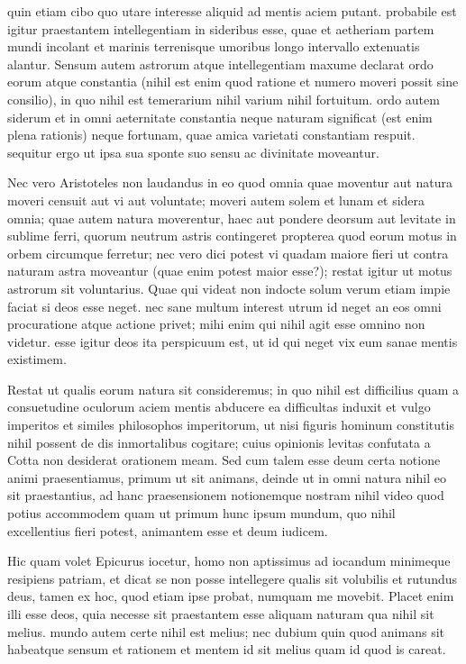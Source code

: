  quin etiam cibo quo utare interesse aliquid ad mentis aciem putant. probabile est igitur praestantem intellegentiam in sideribus esse, quae et aetheriam partem mundi incolant et marinis terrenisque umoribus longo intervallo extenuatis alantur. Sensum autem astrorum atque intellegentiam maxume declarat ordo eorum atque constantia (nihil est enim quod ratione et numero moveri possit sine consilio), in quo nihil est temerarium nihil varium nihil fortuitum. ordo autem siderum et in omni aeternitate constantia neque naturam significat (est enim plena rationis) neque fortunam, quae amica varietati constantiam respuit. sequitur ergo ut ipsa sua sponte suo sensu ac divinitate moveantur.

 Nec vero Aristoteles non laudandus in eo quod omnia quae moventur aut natura moveri censuit aut vi aut voluntate; moveri autem solem et lunam et sidera omnia; quae autem natura moverentur, haec aut pondere deorsum aut levitate in sublime ferri, quorum neutrum astris contingeret propterea quod eorum motus in orbem circumque ferretur; nec vero dici potest vi quadam maiore fieri ut contra naturam astra moveantur (quae enim potest maior esse?); restat igitur ut motus astrorum sit voluntarius. Quae qui videat non indocte solum verum etiam impie faciat si deos esse neget. nec sane multum interest utrum id neget an eos omni procuratione atque actione privet; mihi enim qui nihil agit esse omnino non videtur. esse igitur deos ita perspicuum est, ut id qui neget vix eum sanae mentis existimem.

 Restat ut qualis eorum natura sit consideremus; in quo nihil est difficilius quam a consuetudine oculorum aciem mentis abducere ea difficultas induxit et vulgo imperitos et similes philosophos imperitorum, ut nisi figuris hominum constitutis nihil possent de dis inmortalibus cogitare; cuius opinionis levitas confutata a Cotta non desiderat orationem meam. Sed cum talem esse deum certa notione animi praesentiamus, primum ut sit animans, deinde ut in omni natura nihil eo sit praestantius, ad hanc praesensionem notionemque nostram nihil video quod potius accommodem quam ut primum hunc ipsum mundum, quo nihil excellentius fieri potest, animantem esse et deum iudicem.

 Hic quam volet Epicurus iocetur, homo non aptissimus ad iocandum minimeque resipiens patriam, et dicat se non posse intellegere qualis sit volubilis et rutundus deus, tamen ex hoc, quod etiam ipse probat, numquam me movebit. Placet enim illi esse deos, quia necesse sit praestantem esse aliquam naturam qua nihil sit melius. mundo autem certe nihil est melius; nec dubium quin quod animans sit habeatque sensum et rationem et mentem id sit melius quam id quod is careat.

